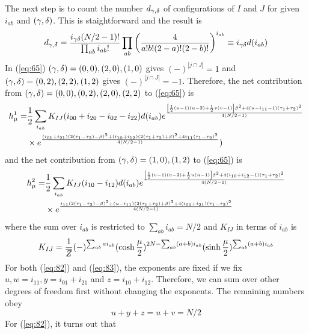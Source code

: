 \documentclass[11pt]{article}
\renewcommand{\>}{\rangle}
\newcommand{\<}{\langle}
\begin{document}
The next step is to count the number $d_{\gamma,\delta}$ of configurations
of $I$ and $J$ for given $i_{ab}$ and $(\gamma,\delta)$. This is staightforward
and the result is
\begin{equation}
d_{\gamma,\delta}=\frac{i_{\gamma\delta}(N/2-1)!}{\prod_{ab}i_{ab}!}\prod_{ab}\left(\frac{4}{a!b!(2-a)!(2-b)!}\right)^{i_{ab}}\equiv i_{\gamma\delta}d(i_{ab})
\end{equation}
In (\ref{eq:65}) $(\gamma,\delta)=(0,0),(2,0),(1,0)$ gives $(-)^{|j\cap J|}=1$
and $(\gamma,\delta)=(0,2),(2,2),(1,2)$ gives $(-)^{|j\cap J|}=-1$. Therefore,
the net contribution from $(\gamma,\delta)=(0,0),(0,2),(2,0),(2,2)$ to (\ref{eq:65})
is
\begin{align}
h_{\mu}^{1}= & \frac{1}{2}\sum_{i_{ab}}K_{IJ}(i_{00}+i_{20}-i_{02}-i_{22})d(i_{ab})e^{\frac{\left[\frac{1}{2}(u-1)(u-2)+\frac{1}{2}v(v-1)\right]\beta^{2}+4(u-i_{11}-1)(\tau_{1}+\tau_{2})^{2}}{4(N/2-1)}}\nonumber \\
 & \times e^{\frac{(i_{01}+i_{21})(2(\tau_{1}-\tau_{2})-\beta)^{2}+(i_{10}+i_{12})(2(\tau_{1}+\tau_{2})+\beta)^{2}+4i_{11}(\tau_{1}-\tau_{2})^{2}}{4(N/2-1)}})\label{eq:82}
\end{align}
and the net contribution from $(\gamma,\delta)=(1,0),(1,2)$ to (\ref{eq:65})
is
\begin{align}
h_{\mu}^{2}= & \frac{1}{2}\sum_{i_{ab}}K_{IJ}(i_{10}-i_{12})d(i_{ab})e^{\frac{\left[\frac{1}{2}(v-1)(v-2)+\frac{1}{2}u(u-1)\right]\beta^{2}+4(i_{10}+i_{12}-1)(\tau_{1}+\tau_{2})^{2}}{4(N/2-1)}}\nonumber \\
 & \times e^{\frac{i_{11}(2(\tau_{1}-\tau_{2})-\beta)^{2}+(u-i_{11})(2(\tau_{1}+\tau_{2})+\beta)^{2}+4(i_{01}+i_{21})(\tau_{1}-\tau_{2})^{2}}{4(N/2-1)}}\label{eq:83}
\end{align}
where the sum over $i_{ab}$ is restricted to $\sum_{ab}i_{ab}=N/2$
and $K_{IJ}$ in terms of $i_{ab}$ is
\begin{equation}
K_{IJ}=\frac{1}{\overline{Z}}(-)^{\sum_{ab}ai_{ab}}(\cosh\frac{\mu}{2})^{2N-\sum_{ab}(a+b)i_{ab}}(\sinh\frac{\mu}{2})^{\sum_{ab}(a+b)i_{ab}}
\end{equation}
For both (\ref{eq:82}) and (\ref{eq:83}), the exponents are fixed
if we fix $u,w=i_{11},y=i_{01}+i_{21}$ and $z=i_{10}+i_{12}$. Therefore,
we can sum over other degrees of freedom first without changing the
exponents. The remaining numbers obey
\begin{equation}
u+y+z=u+v=N/2
\end{equation}
For (\ref{eq:82}), it turns out that
\end{document}
